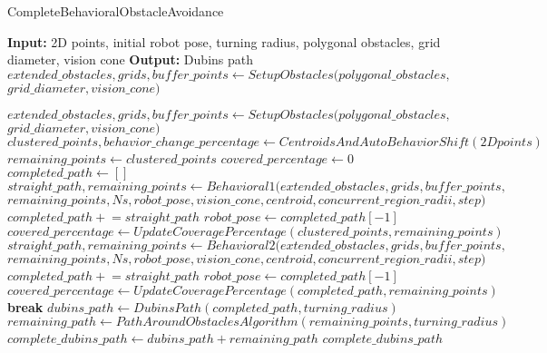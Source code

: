 \begin{algorithm}[H] 
    \caption{CompleteBehavioralObstacleAvoidance}
    \begin{algorithmic}[1]
        \Statex \textbf{Input:} 2D points, initial robot pose, turning radius, polygonal obstacles, grid diameter, vision cone
        \Statex \textbf{Output:} Dubins path
        \newline
        \State $extended\_obstacles, grids, buffer\_points \gets SetupObstacles(polygonal\_obstacles,$
        \Statex \hspace{9cm} $grid\_diameter, vision\_cone)$

        \State $extended\_obstacles, grids, buffer\_points \gets SetupObstacles(polygonal\_obstacles, $
        \Statex \hspace{9cm} $grid\_diameter, vision\_cone)$
        \State $clustered\_points, behavior\_change\_percentage \gets CentroidsAndAutoBehaviorShi f t(2Dpoints)$
        \State $remaining\_points \gets clustered\_points$
        \State $covered\_percentage \gets 0$
        \State $completed\_path \gets []$
                \State $straight\_path, remaining\_points \gets Behavioral1(extended\_obstacles, grids, buffer\_points,$
                \Statex \hspace{\algorithmicindent} $remaining\_points, Ns, robot\_pose, vision\_cone, centroid, concurrent\_region\_radii, step)$
                \State $completed\_path \mathrel{+}= straight\_path$
                \State $robot\_pose \gets completed\_path[-1]$
                \State $covered\_percentage \gets UpdateCoveragePercentage(clustered\_points, remaining\_points)$
            \Else
                \State $straight\_path, remaining\_points \gets Behavioral2(extended\_obstacles, grids, buffer\_points,$
                \Statex \hspace{\algorithmicindent} $remaining\_points, Ns, robot\_pose, vision\_cone, centroid, concurrent\_region\_radii, step)$
                \State $completed\_path \mathrel{+}= straight\_path$
                \State $robot\_pose \gets completed\_path[-1]$
                \State $covered\_percentage \gets UpdateCoveragePercentage(completed\_path, remaining\_points)$
            \EndIf
                \State \textbf{break}
            \EndIf
        \EndWhile
        \State $dubins\_path \gets DubinsPath(completed\_path, turning\_radius)$
        \State $remaining\_path \gets PathAroundObstaclesAlgorithm(remaining\_points, turning\_radius)$
        \State $complete\_dubins\_path \gets dubins\_path + remaining\_path$
        \State \Return $complete\_dubins\_path$
    \end{algorithmic}
\end{algorithm}



